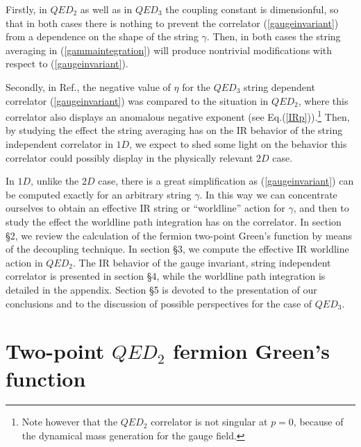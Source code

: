\documentclass[a4paper,12pt]{article}
\begin{document}
Firstly, in $QED_2$ as well as in $QED_3$ the coupling constant is dimensionful, so that in both cases there is nothing to prevent the correlator (\ref{gaugeinvariant}) from a dependence on the shape of the string $\gamma$. Then, in both cases the string averaging in (\ref{gammaintegration}) will produce nontrivial modifications with respect to (\ref{gaugeinvariant}). 

Secondly, in Ref.\cite{k1}, the negative value of $\eta$ for the $QED_3$ string dependent correlator (\ref{gaugeinvariant}) was compared to the situation in $QED_2$, where this correlator also displays an anomalous negative exponent (see Eq.(\ref{IRp})).\footnote{Note however that the $QED_2$ correlator is not singular at $p=0$, because of the dynamical mass generation for the gauge field.} Then, by studying the effect the string averaging has on the IR behavior of the  string independent correlator in $1D$, we expect to shed some light on the behavior this correlator could possibly display in the physically relevant $2D$ case. 

In $1D$, unlike the $2D$ case, there is a great simplification as (\ref{gaugeinvariant}) can be computed exactly for an arbitrary string $\gamma$. In this way we can concentrate ourselves to obtain an effective IR string or ``worldline'' action for $\gamma$, and then to study the effect the worldline path integration has on the correlator.
In section \S 2, we review the calculation of the fermion two-point Green's function by means of 
the decoupling technique. In section \S 3, we compute the effective IR worldline action in 
$QED_2$. The IR behavior of the gauge invariant, string independent correlator is presented 
in section \S 4, while the worldline path integration is detailed in the appendix.
Section \S 5 is devoted to the presentation of our conclusions and to the discussion of possible perspectives for the case of $QED_3$.

\section{Two-point $QED_2$ fermion Green's function}
\end{document}
